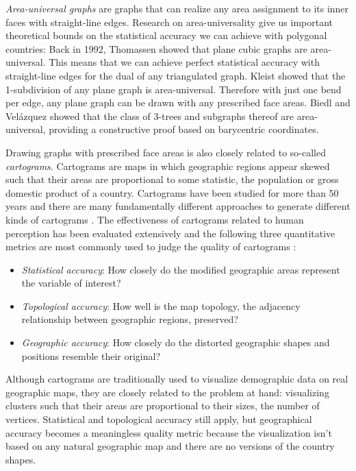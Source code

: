 \emph{Area-universal graphs} are graphs that can realize any area assignment to its inner faces with straight-line edges. Research on area-universality give us important theoretical bounds on the statistical accuracy we can achieve with polygonal countries: Back in 1992, Thomassen \cite{thomassen1992plane} showed that plane cubic graphs are area-universal. This means that we can achieve perfect statistical accuracy with straight-line edges for the dual of any triangulated graph. Kleist \cite{kleist2018drawing} \cite{kleist2019planar} showed that the 1-subdivision of any plane graph is area-universal. Therefore with just one bend per edge, any plane graph can be drawn with any prescribed face areas. Biedl and Velázquez \cite{biedl2013drawing} showed that the class of 3-trees and subgraphs thereof are area-universal, providing a constructive proof based on barycentric coordinates.

Drawing graphs with prescribed face areas is also closely related to so-called \emph{cartograms}. Cartograms are maps in which geographic regions appear skewed such that their areas are proportional to some statistic, \eg{} the population or gross domestic product of a country. Cartograms have been studied for more than 50 years \cite{tobler2004thirty} and there are many fundamentally different approaches to generate different kinds of cartograms \cite{nusrat2016state}. The effectiveness of cartograms related to human perception has been evaluated extensively \cite{nusrat2018evaluating} and the following three quantitative metrics are most commonly used to judge the quality of cartograms \cite{nusrat2016state} \cite{alam2015quantitative} \cite{nusrat2018evaluating}:
%
\begin{itemize}
	\item \emph{Statistical accuracy}: How closely do the modified geographic areas represent the variable of interest?
	\item \emph{Topological accuracy}: How well is the map topology, \ie{} the adjacency relationship between geographic regions, preserved?
	\item \emph{Geographic accuracy}: How closely do the distorted geographic shapes and positions resemble their original?
\end{itemize}

Although cartograms are traditionally used to visualize demographic data on real geographic maps, they are closely related to the problem at hand: visualizing clusters such that their areas are proportional to their sizes, \ie{} the number of vertices. Statistical and topological accuracy still apply, but geographical accuracy becomes a meaningless quality metric because the visualization isn't based on any natural geographic map and there are no  versions of the country shapes.

